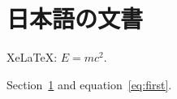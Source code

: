 \documentclass{article}
\begin{document}
\section{日本語の文書}\label{sec:first}
XeLaTeX: $E=mc^2$.

\newpage
Section~\ref{sec:first} and equation~\ref{eq:first}.
\end{document}
